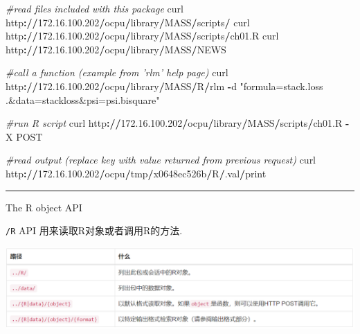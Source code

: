 \documentclass[]{book}
\newenvironment{Shaded}{\begin{snugshade}}{\end{snugshade}}
\newcommand{\FloatTok}[1]{\textcolor[rgb]{0.00,0.00,0.81}{#1}}
\newcommand{\StringTok}[1]{\textcolor[rgb]{0.31,0.60,0.02}{#1}}
\newcommand{\CommentTok}[1]{\textcolor[rgb]{0.56,0.35,0.01}{\textit{#1}}}
\newcommand{\OperatorTok}[1]{\textcolor[rgb]{0.81,0.36,0.00}{\textbf{#1}}}
\newcommand{\ErrorTok}[1]{\textcolor[rgb]{0.64,0.00,0.00}{\textbf{#1}}}
\newcommand{\NormalTok}[1]{#1}
\begin{document}
\begin{Shaded}
\begin{Highlighting}[]
\CommentTok{#read files included with this package}
\NormalTok{curl http}\OperatorTok{:}\ErrorTok{//}\FloatTok{172.16}\NormalTok{.}\FloatTok{100.202}\OperatorTok{/}\NormalTok{ocpu}\OperatorTok{/}\NormalTok{library}\OperatorTok{/}\NormalTok{MASS}\OperatorTok{/}\NormalTok{scripts}\OperatorTok{/}
\NormalTok{curl http}\OperatorTok{:}\ErrorTok{//}\FloatTok{172.16}\NormalTok{.}\FloatTok{100.202}\OperatorTok{/}\NormalTok{ocpu}\OperatorTok{/}\NormalTok{library}\OperatorTok{/}\NormalTok{MASS}\OperatorTok{/}\NormalTok{scripts}\OperatorTok{/}\NormalTok{ch01.R}
\NormalTok{curl http}\OperatorTok{:}\ErrorTok{//}\FloatTok{172.16}\NormalTok{.}\FloatTok{100.202}\OperatorTok{/}\NormalTok{ocpu}\OperatorTok{/}\NormalTok{library}\OperatorTok{/}\NormalTok{MASS}\OperatorTok{/}\NormalTok{NEWS}

\CommentTok{#call a function (example from 'rlm' help page)}
\NormalTok{curl http}\OperatorTok{:}\ErrorTok{//}\FloatTok{172.16}\NormalTok{.}\FloatTok{100.202}\OperatorTok{/}\NormalTok{ocpu}\OperatorTok{/}\NormalTok{library}\OperatorTok{/}\NormalTok{MASS}\OperatorTok{/}\NormalTok{R}\OperatorTok{/}\NormalTok{rlm }\OperatorTok{-}\NormalTok{d }\StringTok{"formula=stack.loss ~ .&data=stackloss&psi=psi.bisquare"}

\CommentTok{#run R script}
\NormalTok{curl http}\OperatorTok{:}\ErrorTok{//}\FloatTok{172.16}\NormalTok{.}\FloatTok{100.202}\OperatorTok{/}\NormalTok{ocpu}\OperatorTok{/}\NormalTok{library}\OperatorTok{/}\NormalTok{MASS}\OperatorTok{/}\NormalTok{scripts}\OperatorTok{/}\NormalTok{ch01.R }\OperatorTok{-}\NormalTok{X POST}

\CommentTok{#read output (replace key with value returned from previous request)}
\NormalTok{curl http}\OperatorTok{:}\ErrorTok{//}\FloatTok{172.16}\NormalTok{.}\FloatTok{100.202}\OperatorTok{/}\NormalTok{ocpu}\OperatorTok{/}\NormalTok{tmp}\OperatorTok{/}\NormalTok{x0648ec526b}\OperatorTok{/}\NormalTok{R}\OperatorTok{/}\NormalTok{.val}\OperatorTok{/}\NormalTok{print}
\end{Highlighting}
\end{Shaded}

\begin{center}\rule{0.5\linewidth}{\linethickness}\end{center}

The R object API

\texttt{/R} API 用来读取R对象或者调用R的方法.

\includegraphics{pic/opencpu/p5.png}
\end{document}
